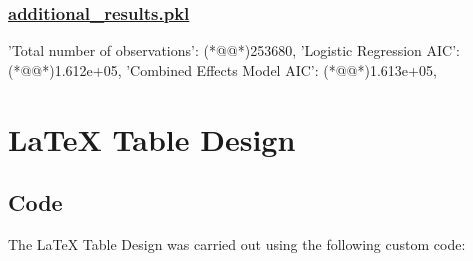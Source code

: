\documentclass[11pt]{article}
\begin{document}
\subsubsection*{\hyperlink{code-additional-results-pkl}{additional\_results.pkl}}

\begin{codeoutput}
{
    'Total number of observations': (*@@*)253680,
    'Logistic Regression AIC': (*@@*)1.612e+05,
    'Combined Effects Model AIC': (*@@*)1.613e+05,
}
\end{codeoutput}

\section{LaTeX Table Design}
\subsection{{Code}}
The LaTeX Table Design was carried out using the following custom code:
\end{document}
